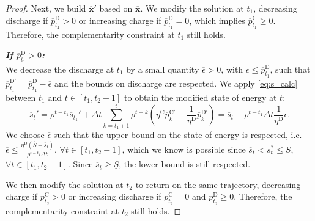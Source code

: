 \documentclass[10pt,a4paper]{amsart}
\newcommand{\up}[1]{^{\mathrm{#1}}}
\begin{document}
\begin{proof}
    Next, we build $\overline{\mathbf{x}}'$ based on $\overline{\mathbf{x}}$. We modify the solution at $t_1$, decreasing discharge if $\overline{p}\up{D}_{t_1}>0$ or increasing charge if $\overline{p}\up{D}_{t_1}=0$, which implies $\overline{p}\up{C}_{t_1}\geq0$. Therefore, the complementarity constraint at $t_1$ still holds.

    \textit{\textbf{If $\overline{p}\up{D}_{t_1}>0$:}} \\ 
    We decrease the discharge at $t_1$ by a small quantity $\overline{\epsilon} > 0$, with ${\epsilon} \leq \overline{p}\up{D}_{t_1}$, such that $\overline{p}\up{D'}_{t_1} = \overline{p}\up{D}_{t_1}-\overline{\epsilon}$ and the bounds on discharge are respected. 
    We apply \eqref{eq:s_calc} between $t_1$ and $t \in [t_1,t_2-1]$ to obtain the modified state of energy at $t$:
    \begin{equation}
        \overline{s}_t' = \rho^{t - t_1} \overline{s}_{t_1}' + \Delta t \sum_{k=t_1+1}^{t} \rho^{t - k} \left( \eta\up{C} \overline{p}_k\up{C'} - \frac{1}{\eta\up{D}} \overline{p}_k\up{D'} \right)  = \overline{s}_t + \rho^{t - t_1} \Delta t \frac{1}{\eta\up{D}} {\epsilon}.  
    \end{equation}
    We choose $\overline{\epsilon}$ such that the upper bound on the state of energy is respected, i.e. $\overline{\epsilon} \leq  \frac{\eta\up{D} (\overline{S} - \overline{s}_t)}{\rho^{t - t_1} \Delta t}$, $\forall t \in [t_1,t_2-1]$, which we know is possible since $\overline{s}_t < s_t^* \leq \overline{S}$, $ \forall t \in [t_1,t_2-1]$. 
    Since $\overline{s}_t \geq \underline{S}$, the lower bound is still respected.

    We then modify the solution at $t_2$ to return on the same trajectory, decreasing charge if $\overline{p}\up{C}_{t_2}>0$ or increasing discharge if $\overline{p}\up{C}_{t_2}=0$ and $\overline{p}\up{D}_{t_2}\geq0$. Therefore, the complementarity constraint at $t_2$ still holds.


\end{proof}
\end{document}
